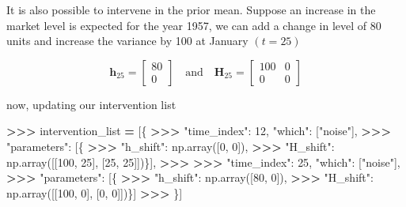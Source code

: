 \documentclass[
]{article}
\newenvironment{Shaded}{\begin{snugshade}}{\end{snugshade}}
\newcommand{\DecValTok}[1]{\textcolor[rgb]{0.00,0.00,0.81}{#1}}
\newcommand{\NormalTok}[1]{#1}
\newcommand{\OperatorTok}[1]{\textcolor[rgb]{0.81,0.36,0.00}{\textbf{#1}}}
\newcommand{\StringTok}[1]{\textcolor[rgb]{0.31,0.60,0.02}{#1}}
\begin{document}
It is also possible to intervene in the prior mean. Suppose an increase
in the market level is expected for the year 1957, we can add a change
in level of 80 units and increase the variance by 100 at January
\((t=25)\)

\[
\mathbf{h}_{25} = \begin{bmatrix}
80 \\ 
0
\end{bmatrix} 
\quad 
\text{and}
\quad 
\mathbf{H}_{25} = \begin{bmatrix}
100 & 0 \\
0 & 0
\end{bmatrix}
\]

now, updating our intervention list

\begin{Shaded}
\begin{Highlighting}[]
\OperatorTok{\textgreater{}\textgreater{}\textgreater{}}\NormalTok{ intervention\_list }\OperatorTok{=}\NormalTok{ [\{}
\OperatorTok{\textgreater{}\textgreater{}\textgreater{}}   \StringTok{"time\_index"}\NormalTok{: }\DecValTok{12}\NormalTok{, }\StringTok{"which"}\NormalTok{: [}\StringTok{"noise"}\NormalTok{],}
\OperatorTok{\textgreater{}\textgreater{}\textgreater{}}   \StringTok{"parameters"}\NormalTok{: [\{}
\OperatorTok{\textgreater{}\textgreater{}\textgreater{}}     \StringTok{"h\_shift"}\NormalTok{: np.array([}\DecValTok{0}\NormalTok{, }\DecValTok{0}\NormalTok{]),}
\OperatorTok{\textgreater{}\textgreater{}\textgreater{}}     \StringTok{"H\_shift"}\NormalTok{: np.array([[}\DecValTok{100}\NormalTok{, }\DecValTok{25}\NormalTok{], [}\DecValTok{25}\NormalTok{, }\DecValTok{25}\NormalTok{]])\}], }
\OperatorTok{\textgreater{}\textgreater{}\textgreater{}}     
\OperatorTok{\textgreater{}\textgreater{}\textgreater{}}   \StringTok{"time\_index"}\NormalTok{: }\DecValTok{25}\NormalTok{, }\StringTok{"which"}\NormalTok{: [}\StringTok{"noise"}\NormalTok{],}
\OperatorTok{\textgreater{}\textgreater{}\textgreater{}}   \StringTok{"parameters"}\NormalTok{: [\{}
\OperatorTok{\textgreater{}\textgreater{}\textgreater{}}     \StringTok{"h\_shift"}\NormalTok{: np.array([}\DecValTok{80}\NormalTok{, }\DecValTok{0}\NormalTok{]),}
\OperatorTok{\textgreater{}\textgreater{}\textgreater{}}     \StringTok{"H\_shift"}\NormalTok{: np.array([[}\DecValTok{100}\NormalTok{, }\DecValTok{0}\NormalTok{], [}\DecValTok{0}\NormalTok{, }\DecValTok{0}\NormalTok{]])\}]}
\OperatorTok{\textgreater{}\textgreater{}\textgreater{}}\NormalTok{ \}]}
\end{Highlighting}
\end{Shaded}
\end{document}
